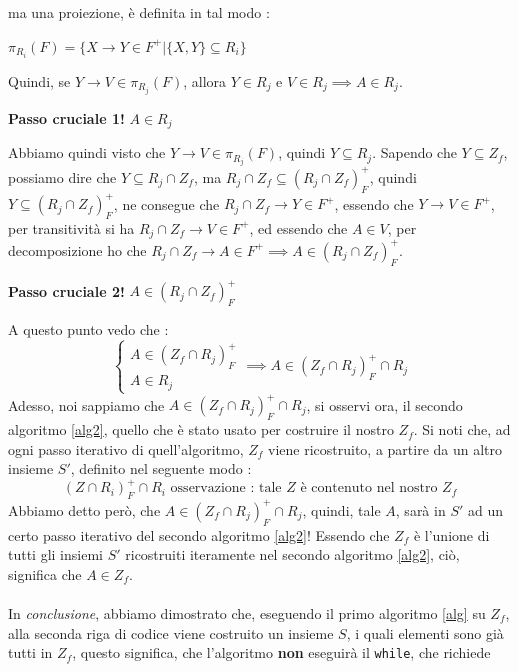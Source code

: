 \documentclass[12pt, letterpaper]{article}
\newcommand{\code}[1]{\colorbox{light-gray}{\texttt{#1}}}
\newcommand{\acc}{\\\hphantom{}\\}
\begin{document}
ma una proiezione, è definita in tal modo : \begin{center}
    \(\pi_{R_i}(F)=\{X\rightarrow Y\in F^+|\{X,Y\}\subseteq R_i\}\)
\end{center}
Quindi, se \(Y\rightarrow V\in \pi_{R_j}(F)\), allora \(Y\in R_j\) e \(V\in R_j\implies A\in R_j\).\begin{center}
    \color{sap}\textbf{Passo cruciale 1!} \color{black}\(A\in R_j\)
\end{center}
Abbiamo quindi visto che \(Y\rightarrow V\in \pi_{R_j}(F)\), quindi \(Y\subseteq R_j\). Sapendo che \(Y\subseteq Z_f\), possiamo 
dire che \(Y\subseteq R_j\cap Z_f\), ma \(R_j\cap Z_f\subseteq (R_j\cap Z_f)_F^+\), quindi \(Y\subseteq (R_j\cap Z_f)_F^+\), ne consegue 
che \(R_j\cap Z_f\rightarrow Y\in F^+\), essendo che \(Y\rightarrow V\in F^+\), per transitività si ha \(R_j\cap Z_f\rightarrow V\in F^+\), 
ed essendo che \(A\in V\), per decomposizione ho che \(R_j\cap Z_f\rightarrow A\in F^+\implies A\in (R_j\cap Z_f)_F^+\).
\begin{center}
    \color{sap}\textbf{Passo cruciale 2!} \color{black}\(A\in (R_j\cap Z_f)_F^+\)
\end{center}
A questo punto vedo che : \begin{equation}
    \begin{cases}
        A\in(Z_f\cap R_j)_F^+\\A\in R_j
    \end{cases}\implies  A\in(Z_f\cap R_j)_F^+\cap R_j
\end{equation}
Adesso, noi sappiamo che \( A\in(Z_f\cap R_j)_F^+\cap R_j\), si osservi ora, il secondo algoritmo \ref{alg2}, quello che è 
stato usato per costruire il nostro \(Z_f\). Si noti che, ad ogni passo iterativo di quell'algoritmo, \(Z_f\) viene ricostruito, 
a partire da un altro insieme \(S'\), definito nel seguente modo : \begin{equation}
    (Z\cap R_i)^+_F\cap R_i\text{ osservazione : tale }Z\text{ è contenuto nel nostro }Z_f
\end{equation}
Abbiamo detto però, che \( A\in(Z_f\cap R_j)_F^+\cap R_j\), quindi, tale \(A\), sarà in \(S'\) ad un certo passo iterativo 
del secondo algoritmo \ref{alg2}! Essendo che \(Z_f\) è l'unione di tutti gli insiemi 
\(S'\) ricostruiti iteramente nel secondo algoritmo \ref{alg2}, ciò, significa che \(A\in Z_f\). \acc In \textit{conclusione}, 
abbiamo dimostrato che, eseguendo il primo algoritmo \ref{alg} su \(Z_f\), alla seconda riga di codice viene costruito un insieme \(S\), 
i quali elementi sono già  tutti in \(Z_f\), questo significa, che l'algoritmo \textbf{non} eseguirà il \code{while}, che richiede 
\end{document}

